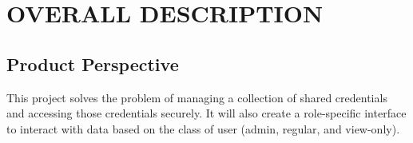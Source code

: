 \documentclass[letterpaper,12pt,oneside,listof=totoc]{scrreprt}
\begin{document}


\chapter{OVERALL DESCRIPTION}

\section{Product Perspective}
This project solves the problem of managing a collection of shared credentials and accessing those credentials securely. It will also create a role-specific interface to interact with data based on the class of user (admin, regular, and view-only).

\end{document}
